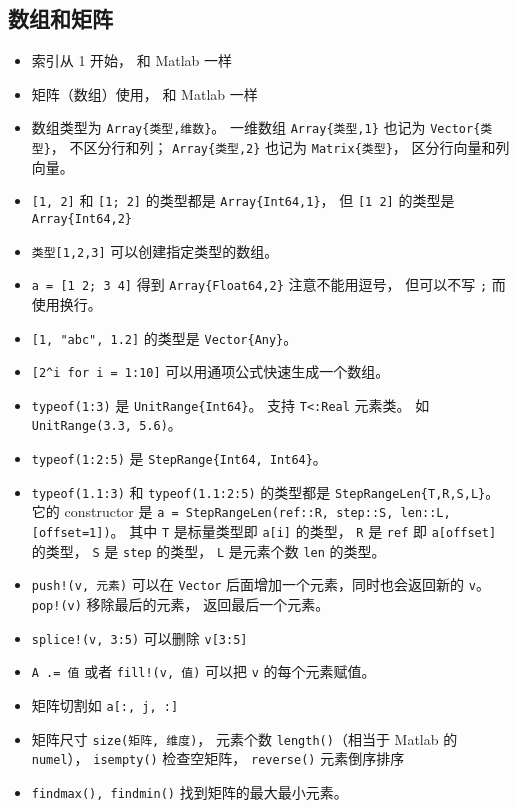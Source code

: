 \subsection{数组和矩阵}
\begin{itemize}
\item 索引从 1 开始， 和 Matlab 一样
\item 矩阵（数组）使用， 和 Matlab 一样
\item 数组类型为 \verb`Array{类型,维数}`。 一维数组 \verb`Array{类型,1}` 也记为 \verb`Vector{类型}`， 不区分行和列； \verb`Array{类型,2}` 也记为 \verb`Matrix{类型}`， 区分行向量和列向量。
\item \verb`[1, 2]` 和 \verb`[1; 2]` 的类型都是 \verb`Array{Int64,1}`， 但 \verb`[1 2]` 的类型是 \verb`Array{Int64,2}`
\item \verb`类型[1,2,3]` 可以创建指定类型的数组。
\item \verb`a = [1 2; 3 4]` 得到 \verb`Array{Float64,2}` 注意不能用逗号， 但可以不写 \verb`;` 而使用换行。
\item \verb`[1, "abc", 1.2]` 的类型是 \verb`Vector{Any}`。
\item \verb`[2^i for i = 1:10]` 可以用通项公式快速生成一个数组。
\item \verb`typeof(1:3)` 是 \verb`UnitRange{Int64}`。 支持 \verb`T<:Real` 元素类。 如 \verb`UnitRange(3.3, 5.6)`。
\item \verb`typeof(1:2:5)` 是 \verb`StepRange{Int64, Int64}`。
\item \verb`typeof(1.1:3)` 和 \verb`typeof(1.1:2:5)` 的类型都是 \verb`StepRangeLen{T,R,S,L}`。 它的 constructor 是 \verb`a = StepRangeLen(ref::R, step::S, len::L, [offset=1])`。 其中 \verb`T` 是标量类型即 \verb`a[i]` 的类型， \verb`R` 是 \verb`ref` 即 \verb`a[offset]` 的类型， \verb`S` 是 \verb`step` 的类型， \verb`L` 是元素个数 \verb`len` 的类型。
\item \verb`push!(v, 元素)` 可以在 \verb`Vector` 后面增加一个元素，同时也会返回新的 \verb`v`。 \verb`pop!(v)` 移除最后的元素， 返回最后一个元素。
\item \verb`splice!(v, 3:5)` 可以删除 \verb`v[3:5]`
\item \verb`A .= 值` 或者 \verb`fill!(v, 值)` 可以把 \verb`v` 的每个元素赋值。
\item 矩阵切割如 \verb`a[:, j, :]`
\item 矩阵尺寸 \verb`size(矩阵, 维度)`， 元素个数 \verb`length()`（相当于 Matlab 的 \verb`numel`）， \verb`isempty()` 检查空矩阵， \verb`reverse()` 元素倒序排序
\item \verb`findmax(), findmin()` 找到矩阵的最大最小元素。

\end{itemize}
